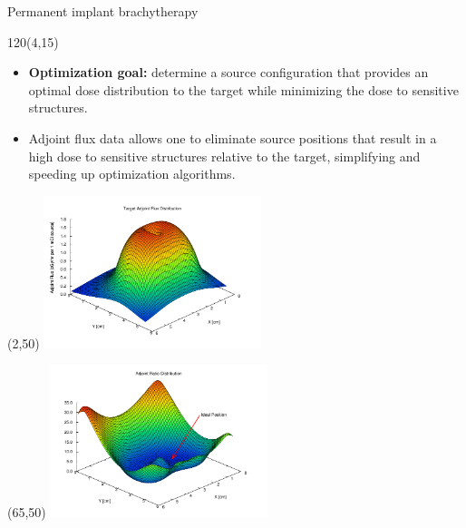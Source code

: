 \documentclass{beamer}
\begin{document}
\begin{frame}{Permanent implant brachytherapy}

  \begin{textblock}{120}(4,15)
    \begin{itemize}
      \item \textbf{Optimization goal:} determine a source configuration
        that provides an optimal dose distribution to the target while
        minimizing the dose to sensitive structures.
      \item Adjoint flux data allows one to eliminate source positions that 
        result in a high dose to sensitive structures relative to the target,
        simplifying and speeding up optimization algorithms.
    \end{itemize}
  \end{textblock}

   \begin{textblock}{20}(2,50)
    \includegraphics[width=2.5in]{figures/Target_adjoint_flux-midplane.pdf}
  \end{textblock}

   \begin{textblock}{20}(65,50)
    \includegraphics[width=2.5in]{figures/adjoint_ratio-slice5.pdf}
  \end{textblock}

\end{frame}
\end{document}
